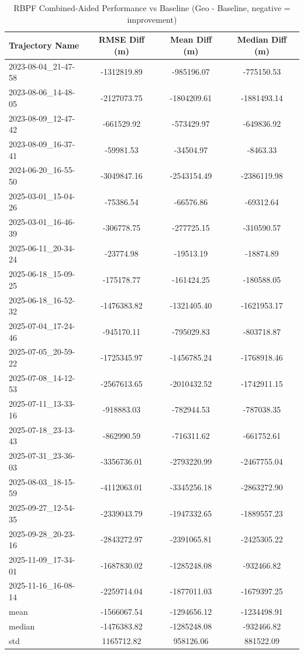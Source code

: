 \begin{table}[h]
    \centering
    \caption{RBPF Combined-Aided Performance vs Baseline (Geo - Baseline, negative = improvement)}
    \begin{tabular}{ || l  ||ccc|| }
    \toprule
   Trajectory Name & RMSE Diff (m) & Mean Diff (m) & Median Diff (m) \\
        \midrule
        2023-08-04\_21-47-58 & -1312819.89 & -985196.07 & -775150.53 \\
        2023-08-06\_14-48-05 & -2127073.75 & -1804209.61 & -1881493.14 \\
        2023-08-09\_12-47-42 & -661529.92 & -573429.97 & -649836.92 \\
        2023-08-09\_16-37-41 & -59981.53 & -34504.97 & -8463.33 \\
        2024-06-20\_16-55-50 & -3049847.16 & -2543154.49 & -2386119.98 \\
        2025-03-01\_15-04-26 & -75386.54 & -66576.86 & -69312.64 \\
        2025-03-01\_16-46-39 & -306778.75 & -277725.15 & -310590.57 \\
        2025-06-11\_20-34-24 & -23774.98 & -19513.19 & -18874.89 \\
        2025-06-18\_15-09-25 & -175178.77 & -161424.25 & -180588.05 \\
        2025-06-18\_16-52-32 & -1476383.82 & -1321405.40 & -1621953.17 \\
        2025-07-04\_17-24-46 & -945170.11 & -795029.83 & -803718.87 \\
        2025-07-05\_20-59-22 & -1725345.97 & -1456785.24 & -1768918.46 \\
        2025-07-08\_14-12-53 & -2567613.65 & -2010432.52 & -1742911.15 \\
        2025-07-11\_13-33-16 & -918883.03 & -782944.53 & -787038.35 \\
        2025-07-18\_23-13-43 & -862990.59 & -716311.62 & -661752.61 \\
        2025-07-31\_23-36-03 & -3356736.01 & -2793220.99 & -2467755.04 \\
        2025-08-03\_18-15-59 & -4112063.01 & -3345256.18 & -2863272.90 \\
        2025-09-27\_12-54-35 & -2339043.79 & -1947332.65 & -1889557.23 \\
        2025-09-28\_20-23-16 & -2843272.97 & -2391065.81 & -2425305.22 \\
        2025-11-09\_17-34-01 & -1687830.02 & -1285248.08 & -932466.82 \\
        2025-11-16\_16-08-14 & -2259714.04 & -1877011.03 & -1679397.25 \\
        \midrule
        mean & -1566067.54 & -1294656.12 & -1234498.91 \\
        median & -1476383.82 & -1285248.08 & -932466.82 \\
        std & 1165712.82 & 958126.06 & 881522.09 \\
        \bottomrule
    \end{tabular}
    \label{tab:rbpf_results}
\end{table}